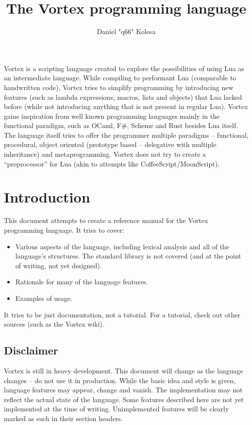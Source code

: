 \documentclass{article}
\title{The Vortex programming language}
\author{Daniel "q66" Kolesa}
\begin{document}
\maketitle
\thispagestyle{empty}

\abstract
Vortex is a scripting language created to explore the possibilities of using Lua as an intermediate language. While compiling to performant Lua (comparable to handwritten code), Vortex tries to simplify programming by introducing new features (such as lambda expressions, macros, lists and objects) that Lua lacked before (while not introducing anything that is not present in regular Lua). Vortex gains inspiration from well known programming languages mainly in the functional paradigm, such as OCaml, F\#, Scheme and Rust besides Lua itself. The language itself tries to offer the programmer multiple paradigms -- functional, procedural, object oriented (prototype based -- delegative with multiple inheritance) and metaprogramming. Vortex does not try to create a \enquote{preprocessor} for Lua (akin to attempts like CoffeeScript/MoonScript).

\newpage
\thispagestyle{empty}
\tableofcontents
\pagebreak

\section{Introduction}
This document attempts to create a reference manual for the Vortex programming language. It tries to cover:
\begin{itemize}
  \item Various aspects of the language, including lexical analysis and all of the language's structures. The standard library is not covered (and at the point of writing, not yet designed).
  \item Rationale for many of the language features.
  \item Examples of usage.
\end{itemize}
It tries to be just documentation, not a tutorial. For a tutorial, check out other sources (such as the Vortex wiki).

\subsection{Disclaimer}
Vortex is still in heavy development. This document will change as the language changes -- do not use it in production. While the basic idea and style is given, language features may appear, change and vanish. The implementation may not reflect the actual state of the language. Some features described here are not yet implemented at the time of writing. Unimplemented features will be clearly marked as such in their section headers.
\end{document}
